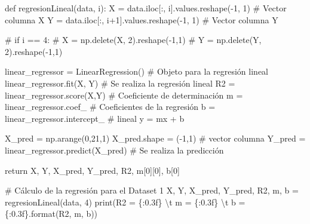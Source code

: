 \documentclass[
  letterpaper,
  DIV=11,
  numbers=noendperiod]{scrreprt}
\newenvironment{Shaded}{\begin{snugshade}}{\end{snugshade}}
\newcommand{\BuiltInTok}[1]{\textcolor[rgb]{0.00,0.23,0.31}{#1}}
\newcommand{\CharTok}[1]{\textcolor[rgb]{0.13,0.47,0.30}{#1}}
\newcommand{\CommentTok}[1]{\textcolor[rgb]{0.37,0.37,0.37}{#1}}
\newcommand{\ControlFlowTok}[1]{\textcolor[rgb]{0.00,0.23,0.31}{#1}}
\newcommand{\DecValTok}[1]{\textcolor[rgb]{0.68,0.00,0.00}{#1}}
\newcommand{\KeywordTok}[1]{\textcolor[rgb]{0.00,0.23,0.31}{#1}}
\newcommand{\NormalTok}[1]{\textcolor[rgb]{0.00,0.23,0.31}{#1}}
\newcommand{\OperatorTok}[1]{\textcolor[rgb]{0.37,0.37,0.37}{#1}}
\newcommand{\SpecialCharTok}[1]{\textcolor[rgb]{0.37,0.37,0.37}{#1}}
\newcommand{\StringTok}[1]{\textcolor[rgb]{0.13,0.47,0.30}{#1}}
\begin{document}
\begin{Shaded}
\begin{Highlighting}[]
\KeywordTok{def}\NormalTok{ regresionLineal(data, i):}
\NormalTok{    X }\OperatorTok{=}\NormalTok{ data.iloc[:, i].values.reshape(}\OperatorTok{{-}}\DecValTok{1}\NormalTok{, }\DecValTok{1}\NormalTok{)   }\CommentTok{\# Vector columna X}
\NormalTok{    Y }\OperatorTok{=}\NormalTok{ data.iloc[:, i}\OperatorTok{+}\DecValTok{1}\NormalTok{].values.reshape(}\OperatorTok{{-}}\DecValTok{1}\NormalTok{, }\DecValTok{1}\NormalTok{) }\CommentTok{\# Vector columna Y}
    
\CommentTok{\#    if i == 4:}
\CommentTok{\#        X = np.delete(X, 2).reshape({-}1,1)}
\CommentTok{\#        Y = np.delete(Y, 2).reshape({-}1,1)}

\NormalTok{    linear\_regressor }\OperatorTok{=}\NormalTok{ LinearRegression() }\CommentTok{\# Objeto para la regresión lineal}
\NormalTok{    linear\_regressor.fit(X, Y)            }\CommentTok{\# Se realiza la regresión lineal}
\NormalTok{    R2 }\OperatorTok{=}\NormalTok{ linear\_regressor.score(X,Y)      }\CommentTok{\# Coeficiente de determinación}
\NormalTok{    m }\OperatorTok{=}\NormalTok{ linear\_regressor.coef\_            }\CommentTok{\# Coeficientes de la regresión}
\NormalTok{    b }\OperatorTok{=}\NormalTok{ linear\_regressor.intercept\_       }\CommentTok{\# lineal y = mx + b }

\NormalTok{    X\_pred }\OperatorTok{=}\NormalTok{ np.arange(}\DecValTok{0}\NormalTok{,}\DecValTok{21}\NormalTok{,}\DecValTok{1}\NormalTok{)}
\NormalTok{    X\_pred.shape }\OperatorTok{=}\NormalTok{ (}\OperatorTok{{-}}\DecValTok{1}\NormalTok{,}\DecValTok{1}\NormalTok{) }\CommentTok{\# vector columna}
\NormalTok{    Y\_pred }\OperatorTok{=}\NormalTok{ linear\_regressor.predict(X\_pred)  }\CommentTok{\# Se realiza la predicción}
    
    \ControlFlowTok{return}\NormalTok{ X, Y, X\_pred, Y\_pred, R2, m[}\DecValTok{0}\NormalTok{][}\DecValTok{0}\NormalTok{], b[}\DecValTok{0}\NormalTok{]}
\end{Highlighting}
\end{Shaded}

\begin{Shaded}
\begin{Highlighting}[]
\CommentTok{\# Cálculo de la regresión para el Dataset 1}
\NormalTok{X, Y, X\_pred, Y\_pred, R2, m, b }\OperatorTok{=}\NormalTok{ regresionLineal(data, }\DecValTok{4}\NormalTok{)}
\BuiltInTok{print}\NormalTok{(}\StringTok{\textquotesingle{}R2 = }\SpecialCharTok{\{:0.3f\}}\StringTok{ }\CharTok{\textbackslash{}t}\StringTok{ m = }\SpecialCharTok{\{:0.3f\}}\StringTok{ }\CharTok{\textbackslash{}t}\StringTok{ b = }\SpecialCharTok{\{:0.3f\}}\StringTok{\textquotesingle{}}\NormalTok{.}\BuiltInTok{format}\NormalTok{(R2, m, b))}
\end{Highlighting}
\end{Shaded}
\end{document}
